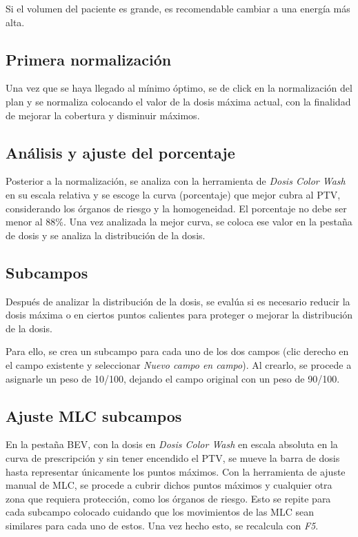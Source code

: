 \documentclass{article}
\begin{document}
Si el volumen del paciente es grande, es recomendable cambiar a una energía más alta.

\subsection*{Primera normalización}

Una vez que se haya llegado al mínimo óptimo, se de click en la normalización del plan y se normaliza colocando el valor de la dosis máxima actual, con la finalidad de mejorar la cobertura y disminuir máximos.

\subsection*{Análisis y ajuste del porcentaje}

Posterior a la normalización, se analiza con la herramienta de \textit{Dosis Color Wash} en su escala relativa y se escoge la curva (porcentaje) que mejor cubra al PTV, considerando los órganos de riesgo y la homogeneidad. El porcentaje no debe ser menor al 88\%. Una vez analizada la mejor curva, se coloca ese valor en la pestaña de dosis y se analiza la distribución de la dosis.

\subsection*{Subcampos}

Después de analizar la distribución de la dosis, se evalúa si es necesario reducir la dosis máxima o en ciertos puntos calientes para proteger o mejorar la distribución de la dosis.

Para ello, se crea un subcampo para cada uno de los dos campos (clic derecho en el campo existente y seleccionar \textit{Nuevo campo en campo}). Al crearlo, se procede a asignarle un peso de 10/100, dejando el campo original con un peso de 90/100.

\subsection*{Ajuste MLC subcampos}

En la pestaña BEV, con la dosis en \textit{Dosis Color Wash} en escala absoluta en la curva de prescripción y sin tener encendido el PTV, se mueve la barra de dosis hasta representar únicamente los puntos máximos. Con la herramienta de ajuste manual de MLC, se procede a cubrir dichos puntos máximos y cualquier otra zona que requiera protección, como los órganos de riesgo. Esto se repite para cada subcampo colocado cuidando que los movimientos de las MLC sean similares para cada uno de estos. Una vez hecho esto, se recalcula con \textit{F5}.
\end{document}
